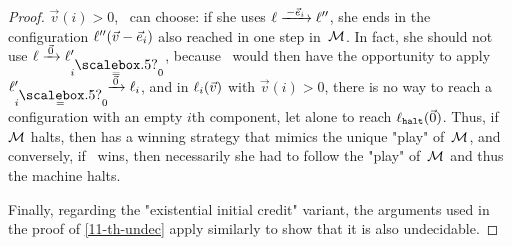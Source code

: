 \begin{proof}
  $\vec v(i)>0$, \Eve\ can choose: if she uses
  $\loc\step{-\vec e_i}\loc''$, she ends in the configuration
  $\ell''(\vec v-\vec e_i)$ also reached in one step in~$\mathcal M$.  In
  fact, she should not use $\loc\step{\vec 0}\loc'_{i\eqby?0}$,
  because \Adam\ would then have the opportunity to apply
  $\loc'_{i\eqby?0}\!\!\step{\vec 0}\loc_{i}$, and in
  $\ell_{i}(\vec v)$ with $\vec v(i)>0$, there is no way to
  reach a configuration with an empty $i$th component, let alone to
  reach $\ell_\mathtt{halt}(\vec 0)$.  Thus, if $\mathcal M$ halts, then \Eve
  has a winning strategy that mimics the unique "play"
  of~$\mathcal M$, and conversely, if \Eve\ wins, then necessarily she had to
  follow the "play" of~$\mathcal M$ and thus the machine halts.

  \medskip Finally, regarding the "existential initial credit"
  variant, the arguments used in the proof of \cref{11-th-undec} apply
  similarly to show that it is also undecidable.
\end{proof}

